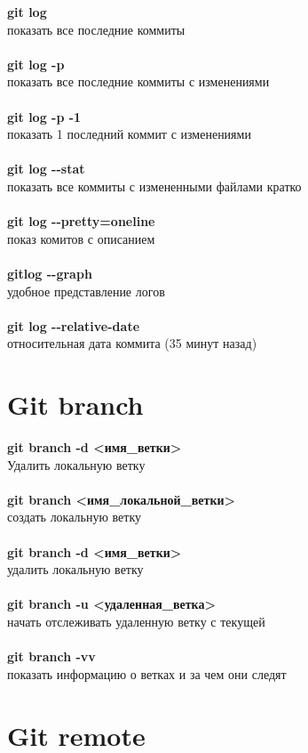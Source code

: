 \documentclass[a4paper, 12px]{report}
\begin{document}
\textbf{git log}\\показать все последние коммиты\\\\
\textbf{git log -p}\\показать все последние коммиты с изменениями\\\\
\textbf{git log -p -1}\\показать 1 последний коммит с изменениями\\\\
\textbf{git log -\--stat}\\показать все коммиты с измененными файлами кратко\\\\
\textbf{git log -\--pretty=oneline}\\показ комитов с описанием\\\\
\textbf{gitlog -\--graph}\\удобное представление логов\\\\
\textbf{git log -\--relative-date}\\относительная дата коммита (35 минут назад)

\section{Git branch}

\textbf{git branch -d <имя\_ветки>}\\Удалить локальную ветку\\\\
\textbf{git branch <имя\_локальной\_ветки>}\\создать локальную ветку\\\\
\textbf{git branch -d <имя\_ветки>}\\удалить локальную ветку\\\\
\textbf{git branch -u <удаленная\_ветка>}\\начать отслеживать удаленную ветку с текущей\\\\
\textbf{git branch -vv}\\показать информацию о ветках и за чем они следят

\section{Git remote}
\end{document}

